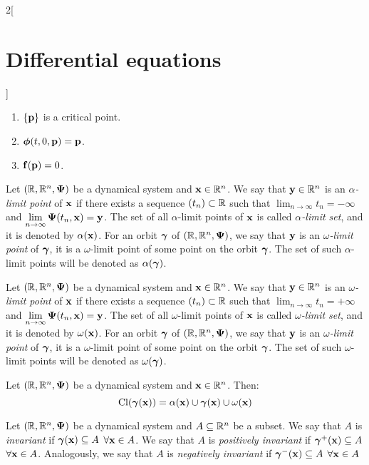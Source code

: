 \documentclass[../../../main.tex]{subfiles}
\begin{document}
\begin{multicols}{2}[\section{Differential equations}]
\begin{proposition}
    \begin{enumerate}
      \item $\{\boldsymbol{\mathrm{p}}\}$ is a critical point.
      \item $\boldsymbol{\mathrm{\phi}}(t,0,\boldsymbol{\mathrm{p}})=\boldsymbol{\mathrm{p}}$.
      \item $\boldsymbol{\mathrm{f}}(\boldsymbol{\mathrm{p}})=0$.
    \end{enumerate}
  \end{proposition}
  \begin{definition}
    Let $(\mathbb{R},\mathbb{R}^n,\boldsymbol{\mathrm{\Psi}})$ be a dynamical system and $\boldsymbol{\mathrm{x}}\in\mathbb{R}^n$. We say that $\boldsymbol{\mathrm{y}}\in\mathbb{R}^n$ is an \emph{$\alpha$-limit point} of $\boldsymbol{\mathrm{x}}$ if there exists a sequence $(t_n)\subset\mathbb{R}$ such that $\displaystyle\lim_{n\to\infty}t_n=-\infty$ and $\displaystyle\lim_{n\to\infty}\boldsymbol{\mathrm{\Psi}}(t_n,\boldsymbol{\mathrm{x}})=\boldsymbol{\mathrm{y}}$.
    The set of all $\alpha$-limit points of $\boldsymbol{\mathrm{x}}$ is called \emph{$\alpha$-limit set}, and it is denoted by $\alpha(\boldsymbol{\mathrm{x}})$. For an orbit $\boldsymbol{\mathrm{\gamma}}$ of $(\mathbb{R},\mathbb{R}^n,\boldsymbol{\mathrm{\Psi}})$, we say that $\boldsymbol{\mathrm{y}}$ is an \emph{$\omega$-limit point} of $\boldsymbol{\mathrm{\gamma}}$, it is a $\omega$-limit point of some point on the orbit $\boldsymbol{\mathrm{\gamma}}$. The set of such $\alpha$-limit points will be denoted as $\alpha(\boldsymbol{\mathrm{\gamma}})$.
  \end{definition}
  \begin{definition}
    Let $(\mathbb{R},\mathbb{R}^n,\boldsymbol{\mathrm{\Psi}})$ be a dynamical system and $\boldsymbol{\mathrm{x}}\in\mathbb{R}^n$. We say that $\boldsymbol{\mathrm{y}}\in\mathbb{R}^n$ is an \emph{$\omega$-limit point} of $\boldsymbol{\mathrm{x}}$ if there exists a sequence $(t_n)\subset\mathbb{R}$ such that $\displaystyle\lim_{n\to\infty}t_n=+\infty$ and $\displaystyle\lim_{n\to\infty}\boldsymbol{\mathrm{\Psi}}(t_n,\boldsymbol{\mathrm{x}})=\boldsymbol{\mathrm{y}}$.
    The set of all $\omega$-limit points of $\boldsymbol{\mathrm{x}}$ is called \emph{$\omega$-limit set}, and it is denoted by $\omega(\boldsymbol{\mathrm{x}})$. For an orbit $\boldsymbol{\mathrm{\gamma}}$ of $(\mathbb{R},\mathbb{R}^n,\boldsymbol{\mathrm{\Psi}})$, we say that $\boldsymbol{\mathrm{y}}$ is an \emph{$\omega$-limit point} of $\boldsymbol{\mathrm{\gamma}}$, it is a $\omega$-limit point of some point on the orbit $\boldsymbol{\mathrm{\gamma}}$. The set of such $\omega$-limit points will be denoted as $\omega(\boldsymbol{\mathrm{\gamma}})$.
  \end{definition}
  \begin{proposition}
    Let $(\mathbb{R},\mathbb{R}^n,\boldsymbol{\mathrm{\Psi}})$ be a dynamical system and $\boldsymbol{\mathrm{x}}\in\mathbb{R}^n$. Then: $$\operatorname{Cl}(\boldsymbol{\mathrm{\gamma}}(\boldsymbol{\mathrm{x}}))=\alpha(\boldsymbol{\mathrm{x}})\cup\boldsymbol{\mathrm{\gamma}}(\boldsymbol{\mathrm{x}})\cup\omega(\boldsymbol{\mathrm{x}})$$
  \end{proposition}
  \begin{definition}
    Let $(\mathbb{R},\mathbb{R}^n,\boldsymbol{\mathrm{\Psi}})$ be a dynamical system and $A\subseteq \mathbb{R}^n$ be a subset. We say that $A$ is \emph{invariant} if $\boldsymbol{\mathrm{\gamma}}(\boldsymbol{\mathrm{x}})\subseteq A$ $\forall\boldsymbol{\mathrm{x}}\in A$. We say that $A$ is \emph{positively invariant} if ${\boldsymbol{\mathrm{\gamma}}}^+(\boldsymbol{\mathrm{x}})\subseteq A$ $\forall\boldsymbol{\mathrm{x}}\in A$. Analogously, we say that $A$ is \emph{negatively invariant} if ${\boldsymbol{\mathrm{\gamma}}}^-(\boldsymbol{\mathrm{x}})\subseteq A$ $\forall\boldsymbol{\mathrm{x}}\in A$

\end{definition}
\end{multicols}
\end{document}
